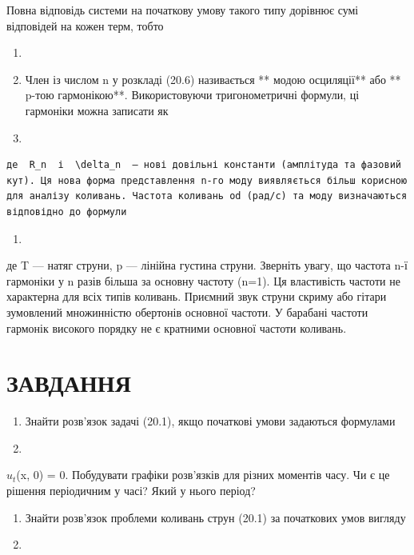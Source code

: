 \documentclass[
  ukrainian,
]{article}
\providecommand{\tightlist}{%
  \setlength{\itemsep}{0pt}\setlength{\parskip}{0pt}}
\begin{document}
Повна відповідь системи на початкову умову такого типу дорівнює сумі
відповідей на кожен терм, тобто

\begin{enumerate}
\def\labelenumi{\arabic{enumi}.}
\setcounter{enumi}{17}
\item
\item
  Член із числом n у розкладі (20.6) називається ** модою осциляції**
  або ** p-тою гармонікою**. Використовуючи тригонометричні формули, ці
  гармоніки можна записати як
\item
\end{enumerate}

\begin{verbatim}
де  R_n  і  \delta_n  — нові довільні константи (амплітуда та фазовий кут). Ця нова форма представлення n-го моду виявляється більш корисною для аналізу коливань. Частота коливань od (рад/с) та моду визначаються відповідно до формули
\end{verbatim}

\begin{enumerate}
\def\labelenumi{\arabic{enumi}.}
\setcounter{enumi}{9}
\tightlist
\item
\end{enumerate}

де T --- натяг струни, p --- лінійна густина струни. Зверніть увагу, що
частота n-ї гармоніки у n разів більша за основну частоту (n=1). Ця
властивість частоти не характерна для всіх типів коливань. Приємний звук
струни скриму або гітари зумовлений множинністю обертонів основної
частоти. У барабані частоти гармонік високого порядку не є кратними
основної частоти коливань.

\section{ЗАВДАННЯ}\label{ux437ux430ux432ux434ux430ux43dux43dux44f-8}

\begin{enumerate}
\def\labelenumi{\arabic{enumi}.}
\item
  Знайти розв'язок задачі (20.1), якщо початкові умови задаються
  формулами
\item
\end{enumerate}

\(u_t\)(x, 0) = 0. Побудувати графіки розв'язків для різних моментів
часу. Чи є це рішення періодичним у часі? Який у нього період?

\begin{enumerate}
\def\labelenumi{\arabic{enumi}.}
\setcounter{enumi}{1}
\item
  Знайти розв'язок проблеми коливань струн (20.1) за початкових умов
  вигляду
\item
\end{enumerate}
\end{document}
